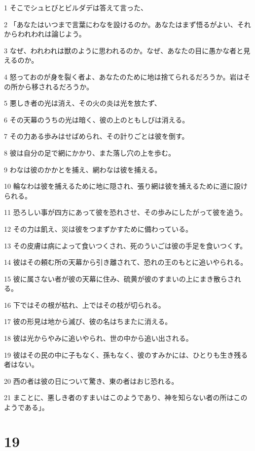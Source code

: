\par 1 そこでシュヒびとビルダデは答えて言った、
\par 2 「あなたはいつまで言葉にわなを設けるのか。あなたはまず悟るがよい、それからわれわれは論じよう。
\par 3 なぜ、われわれは獣のように思われるのか。なぜ、あなたの目に愚かな者と見えるのか。
\par 4 怒っておのが身を裂く者よ、あなたのために地は捨てられるだろうか。岩はその所から移されるだろうか。
\par 5 悪しき者の光は消え、その火の炎は光を放たず、
\par 6 その天幕のうちの光は暗く、彼の上のともしびは消える。
\par 7 その力ある歩みはせばめられ、その計りごとは彼を倒す。
\par 8 彼は自分の足で網にかかり、また落し穴の上を歩む。
\par 9 わなは彼のかかとを捕え、網わなは彼を捕える。
\par 10 輪なわは彼を捕えるために地に隠され、張り網は彼を捕えるために道に設けられる。
\par 11 恐ろしい事が四方にあって彼を恐れさせ、その歩みにしたがって彼を追う。
\par 12 その力は飢え、災は彼をつまずかすために備わっている。
\par 13 その皮膚は病によって食いつくされ、死のういごは彼の手足を食いつくす。
\par 14 彼はその頼む所の天幕から引き離されて、恐れの王のもとに追いやられる。
\par 15 彼に属さない者が彼の天幕に住み、硫黄が彼のすまいの上にまき散らされる。
\par 16 下ではその根が枯れ、上ではその枝が切られる。
\par 17 彼の形見は地から滅び、彼の名はちまたに消える。
\par 18 彼は光からやみに追いやられ、世の中から追い出される。
\par 19 彼はその民の中に子もなく、孫もなく、彼のすみかには、ひとりも生き残る者はない。
\par 20 西の者は彼の日について驚き、東の者はおじ恐れる。
\par 21 まことに、悪しき者のすまいはこのようであり、神を知らない者の所はこのようである」。

\chapter{19}


